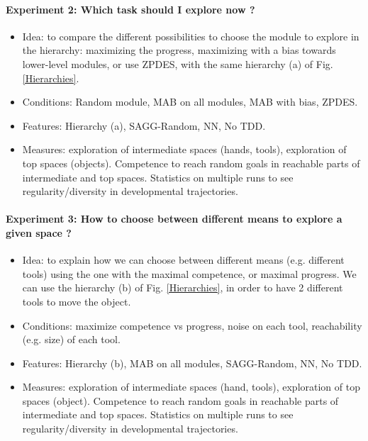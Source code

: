 \documentclass[conference]{include/IEEEtran}
\begin{document}
			\paragraph{Experiment 2: Which task should I explore now ?}
			\begin{itemize}
				\item Idea: to compare the different possibilities to choose the module to explore in the hierarchy: maximizing the progress, maximizing with a bias towards lower-level modules, or use ZPDES,
						with the same hierarchy (a) of Fig. \ref{Hierarchies}.
				
				\item Conditions: Random module, MAB on all modules, MAB with bias, ZPDES.
				
				\item Features: Hierarchy (a), SAGG-Random, NN, No TDD.
				
				\item Measures: exploration of intermediate spaces (hands, tools), exploration of top spaces (objects). Competence to reach random goals in reachable parts of intermediate and top spaces. 
						Statistics on multiple runs to see regularity/diversity in developmental trajectories.
			\end{itemize}
			
			\paragraph{Experiment 3: How to choose between different means to explore a given space ?}
			\begin{itemize}
				\item Idea: to explain how we can choose between different means (e.g. different tools) using the one with the maximal competence, or maximal progress.
						We can use the hierarchy (b) of Fig. \ref{Hierarchies}, in order to have 2 different tools to move the object.
				
				\item Conditions: maximize competence vs progress, noise on each tool, reachability (e.g. size) of each tool.
				
				\item Features: Hierarchy (b), MAB on all modules, SAGG-Random, NN, No TDD.
				
				\item Measures: exploration of intermediate spaces (hand, tools), exploration of top spaces (object). Competence to reach random goals in reachable parts of intermediate and top spaces. 
						Statistics on multiple runs to see regularity/diversity in developmental trajectories.
			\end{itemize}
			
\end{document}
